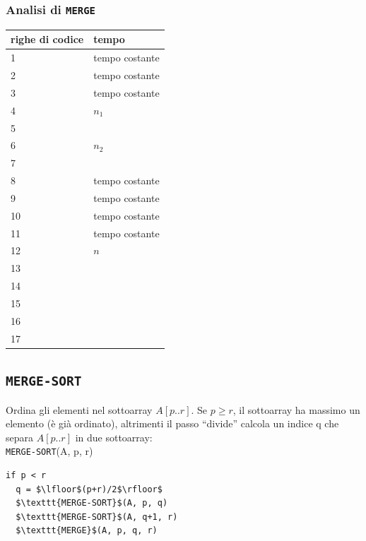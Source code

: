 \documentclass[11pt,a4paper]{article}
\begin{document}
\subsubsection{Analisi di \texttt{MERGE}}
\begin{tabularx}{300pt}{X X}
  righe di codice & tempo \\
  \hline
  1 & tempo costante\\
  2 & tempo costante\\
  3 & tempo costante\\
  4 & $n_1$\\
  5 & \\
  6 & $n_2$\\
  7 & \\
  8 & tempo costante\\
  9 & tempo costante\\
  10 & tempo costante\\
  11 & tempo costante\\
  12 & $n$\\
  13 & \\
  14 & \\
  15 & \\
  16 & \\
  17 & \\
\end{tabularx}

\subsection{\texttt{MERGE-SORT}}
Ordina gli elementi nel sottoarray $A[p..r]$. Se $p \geq r$, il sottoarray ha massimo un elemento (è già ordinato),
altrimenti il passo “divide” calcola un indice q che separa $A[p..r]$ in due sottoarray:\medskip\\
\texttt{MERGE-SORT}(A, p, r)
\begin{lstlisting}[mathescape=true]
if p < r
  q = $\lfloor$(p+r)/2$\rfloor$
  $\texttt{MERGE-SORT}$(A, p, q)
  $\texttt{MERGE-SORT}$(A, q+1, r)
  $\texttt{MERGE}$(A, p, q, r)
\end{lstlisting}
\end{document}
